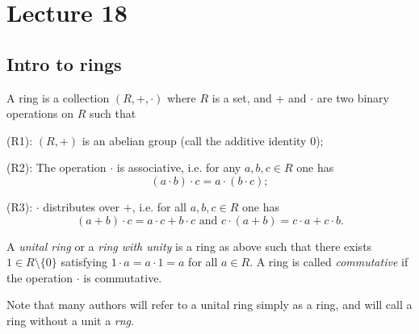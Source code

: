 \section{Lecture 18}
\subsection{Intro to rings}
\begin{definition}
    A ring is a collection $(R,+,\cdot)$ where $R$ is a set, and $+$ and $\cdot$ are two binary operations on $R$ such that 
  
    (R1): $(R,+)$ is an abelian group (call the additive identity $0$);
   
    (R2): The operation $\cdot$ is associative, i.e. for any $a,b,c\in R$ one has $$(a\cdot b)\cdot c = a\cdot (b\cdot c);$$
    
    (R3): $\cdot$ distributes over $+$, i.e. for all $a,b,c\in R$ one has 
      $$(a+b)\cdot c = a\cdot c+b\cdot c \text{ and } c\cdot (a+b)=c\cdot a + c\cdot b.$$
  
  A \emph{unital ring} or a \emph{ring with unity} is a ring as above such that there exists $1\in R\setminus \{0\}$ satisfying $1\cdot a = a\cdot 1 = a$ for all $a\in R$.
  A ring is called \emph{commutative} if the operation $\cdot$ is commutative. 
  \label{def:ring}
\end{definition}
\begin{remark}
  Note that many authors will refer to a unital ring simply as a ring, and will call a ring without a unit a \emph{rng}.
\end{remark}



